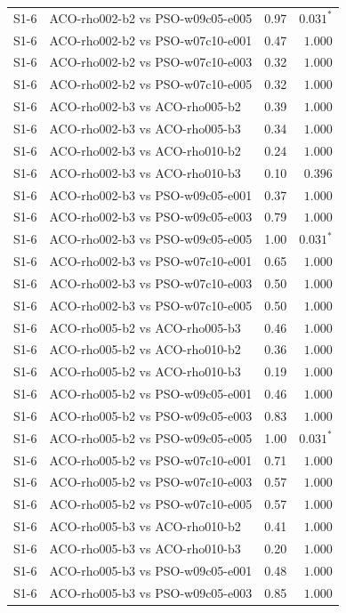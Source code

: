 \begin{tabular}{llrr}
S1-6 & ACO-rho002-b2 vs PSO-w09c05-e005 & 0.97 & $0.031^{*}$ \\
S1-6 & ACO-rho002-b2 vs PSO-w07c10-e001 & 0.47 & $1.000$ \\
S1-6 & ACO-rho002-b2 vs PSO-w07c10-e003 & 0.32 & $1.000$ \\
S1-6 & ACO-rho002-b2 vs PSO-w07c10-e005 & 0.32 & $1.000$ \\
S1-6 & ACO-rho002-b3 vs ACO-rho005-b2 & 0.39 & $1.000$ \\
S1-6 & ACO-rho002-b3 vs ACO-rho005-b3 & 0.34 & $1.000$ \\
S1-6 & ACO-rho002-b3 vs ACO-rho010-b2 & 0.24 & $1.000$ \\
S1-6 & ACO-rho002-b3 vs ACO-rho010-b3 & 0.10 & $0.396$ \\
S1-6 & ACO-rho002-b3 vs PSO-w09c05-e001 & 0.37 & $1.000$ \\
S1-6 & ACO-rho002-b3 vs PSO-w09c05-e003 & 0.79 & $1.000$ \\
S1-6 & ACO-rho002-b3 vs PSO-w09c05-e005 & 1.00 & $0.031^{*}$ \\
S1-6 & ACO-rho002-b3 vs PSO-w07c10-e001 & 0.65 & $1.000$ \\
S1-6 & ACO-rho002-b3 vs PSO-w07c10-e003 & 0.50 & $1.000$ \\
S1-6 & ACO-rho002-b3 vs PSO-w07c10-e005 & 0.50 & $1.000$ \\
S1-6 & ACO-rho005-b2 vs ACO-rho005-b3 & 0.46 & $1.000$ \\
S1-6 & ACO-rho005-b2 vs ACO-rho010-b2 & 0.36 & $1.000$ \\
S1-6 & ACO-rho005-b2 vs ACO-rho010-b3 & 0.19 & $1.000$ \\
S1-6 & ACO-rho005-b2 vs PSO-w09c05-e001 & 0.46 & $1.000$ \\
S1-6 & ACO-rho005-b2 vs PSO-w09c05-e003 & 0.83 & $1.000$ \\
S1-6 & ACO-rho005-b2 vs PSO-w09c05-e005 & 1.00 & $0.031^{*}$ \\
S1-6 & ACO-rho005-b2 vs PSO-w07c10-e001 & 0.71 & $1.000$ \\
S1-6 & ACO-rho005-b2 vs PSO-w07c10-e003 & 0.57 & $1.000$ \\
S1-6 & ACO-rho005-b2 vs PSO-w07c10-e005 & 0.57 & $1.000$ \\
S1-6 & ACO-rho005-b3 vs ACO-rho010-b2 & 0.41 & $1.000$ \\
S1-6 & ACO-rho005-b3 vs ACO-rho010-b3 & 0.20 & $1.000$ \\
S1-6 & ACO-rho005-b3 vs PSO-w09c05-e001 & 0.48 & $1.000$ \\
S1-6 & ACO-rho005-b3 vs PSO-w09c05-e003 & 0.85 & $1.000$ \\

\end{tabular}
